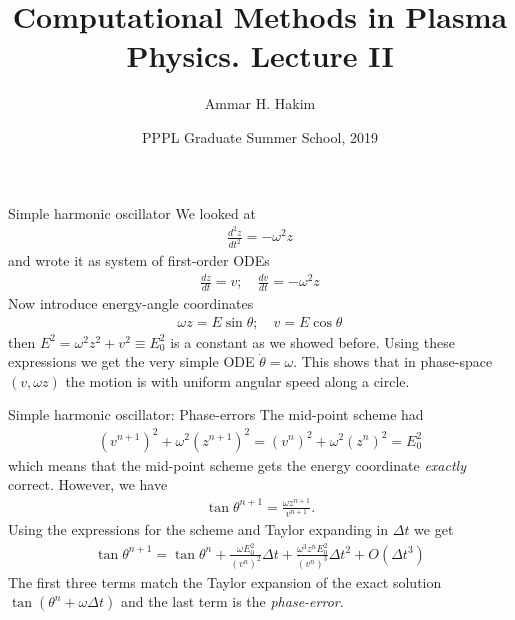 \documentclass[pdf]{beamer}
\title[{\tt }] {Computational Methods in Plasma Physics. Lecture II}%
\author[http://cmpp.rtfd.io]%
{Ammar H. Hakim\inst{1}}%
\institute[PPPL]
{ \inst{1} Princeton Plasma Physics Laboratory, Princeton, NJ %
}
\date[8/13/2019]{PPPL Graduate Summer School, 2019}
\theoremstyle{definition}
\begin{document}
\begin{frame}
  \titlepage
\end{frame}

\begin{frame}{Simple harmonic oscillator}
  We looked at
  \begin{align*}
    \frac{d^2z}{dt^2} = -\omega^2 z
  \end{align*}
  and wrote it as system of first-order ODEs
  \begin{align*}
    \frac{dz}{dt} = v; \quad \frac{dv}{dt} = -\omega^2 z
  \end{align*}
  Now introduce energy-angle coordinates
  \begin{align*}
    \omega z = E\sin\theta; \quad v = E\cos\theta
  \end{align*}
  then $E^2 = \omega^2 z^2 + v^2 \equiv E_0^2$ is a constant as we
  showed before. Using these expressions we get the very simple ODE
  $\dot{\theta} = \omega$. This shows that in phase-space
  $(v,\omega z)$ the motion is with uniform angular speed along a
  circle.
\end{frame}

\begin{frame}{Simple harmonic oscillator: Phase-errors}
  \small%
  The mid-point scheme had
  \begin{align*}
    (v^{n+1})^2 + \omega^2 (z^{n+1})^2 = (v^{n})^2 + \omega^2 (z^{n})^2
    = E_0^2
  \end{align*}
  which means that the mid-point scheme gets the energy coordinate
  \emph{exactly} correct. However, we have
  \begin{align*}
    \tan\theta^{n+1} = \frac{\omega z^{n+1}}{v^{n+1}}.
  \end{align*}
  Using the expressions for the scheme and Taylor expanding in
  $\Delta t$ we get
  \begin{align*}
    \tan\theta^{n+1}
    =
    \tan\theta^n +
    \frac{\omega E_0^2}{(v^{n})^2}\Delta t +
    \frac{\omega^3 z^n E_0^2}{(v^n)^3}\Delta t^2
    + O(\Delta t^3)
  \end{align*}
  The first three terms match the Taylor expansion of the exact
  solution $\tan(\theta^n+\omega\Delta t)$ and the last term is the
  \emph{phase-error}.
\end{frame}
\end{document}
